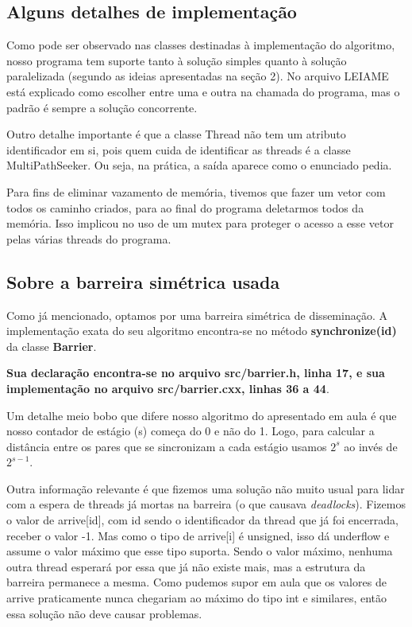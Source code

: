 \documentclass[a4paper,11pt]{article}
\begin{document}
  \subsection{Alguns detalhes de implementação}
    Como pode ser observado nas classes destinadas à implementação do algoritmo,
    nosso programa tem suporte tanto à solução simples quanto à solução
    paralelizada (segundo as ideias apresentadas na seção 2). No arquivo LEIAME
    está explicado como escolher entre uma e outra na chamada do programa, mas
    o padrão é sempre a solução concorrente.

    Outro detalhe importante é que a classe Thread não tem um atributo
    identificador em si, pois quem cuida de identificar as threads é a classe
    MultiPathSeeker. Ou seja, na prática, a saída aparece como o enunciado
    pedia.

    Para fins de eliminar vazamento de memória, tivemos que fazer um vetor com
    todos os caminho criados, para ao final do programa deletarmos todos da
    memória. Isso implicou no uso de um mutex para proteger o acesso a esse
    vetor pelas várias threads do programa.

  \subsection{Sobre a barreira simétrica usada}
    Como já mencionado, optamos por uma barreira simétrica de disseminação. A
    implementação exata do seu algoritmo encontra-se no método
    \textbf{synchronize(id)} da classe \textbf{Barrier}.

    \textbf{Sua declaração encontra-se no arquivo src/barrier.h, linha 17, e sua
    implementação no arquivo src/barrier.cxx, linhas 36 a 44}.

    Um detalhe meio bobo que difere nosso algoritmo do apresentado em aula é que
    nosso contador de estágio (s) começa do 0 e não do 1. Logo, para calcular a
    distância entre os pares que se sincronizam a cada estágio usamos $2^s$ ao
    invés de $2^{s-1}$.

    Outra informação relevante é que fizemos uma solução não muito usual para
    lidar com a espera de threads já mortas na barreira (o que causava
    \textit{deadlocks}). Fizemos o valor de arrive[id], com id sendo o
    identificador da thread que já foi encerrada, receber o valor -1. Mas como
    o tipo de arrive[i] é unsigned, isso dá underflow e assume o valor máximo
    que esse tipo suporta. Sendo o valor máximo, nenhuma outra thread esperará
    por essa que já não existe mais, mas a estrutura da barreira permanece a
    mesma. Como pudemos supor em aula que os valores de arrive praticamente
    nunca chegariam ao máximo do tipo int e similares, então essa solução não
    deve causar problemas.
\end{document}
